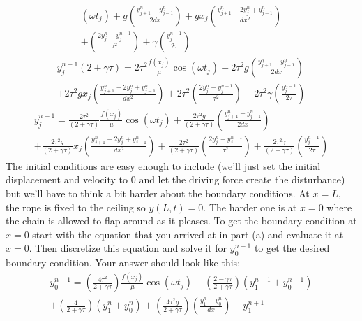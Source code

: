 \begin{enumerate}
\begin{enumerate}
\begin{multline}
  (\omega t_j) + g \left( \frac{y_{j+1}^n - y_{j-1}^n}{2
      dx}\right) + g x_j\left( \frac{y_{j+1}^n - 2 y_j^n +
      y_{j-1}^n}{dx^2}\right)\\ + \left(\frac{ 2 y_j^n -
      y_j^{n-1}}{\tau^2}\right) +
  \gamma \left( \frac{ y_j^{n-1}}{2 \tau}\right) 
\end{multline}
\begin{multline}
  y_j^{n+1}\left( 2 + \gamma \tau\right) = 2\tau^2 \frac{f(x_j)}{\mu} \cos
  (\omega t_j) + 2\tau^2 g \left( \frac{y_{j+1}^n - y_{j-1}^n}{2
      dx}\right)\\ + 2\tau^2 g x_j\left( \frac{y_{j+1}^n - 2 y_j^n +
      y_{j-1}^n}{dx^2}\right) + 2\tau^2\left(\frac{ 2 y_j^n -
      y_j^{n-1}}{\tau^2}\right) +
  2\tau^2\gamma \left( \frac{ y_j^{n-1}}{2 \tau}\right) 
\end{multline}
\begin{multline}
  y_j^{n+1} = \frac{2\tau^2}{\left( 2 + \gamma \tau\right)} \frac{f(x_j)}{\mu}
  \cos (\omega t_j) + \frac{2\tau^2 g }{\left( 2 + \gamma
      \tau\right)} \left( \frac{y_{j+1}^n - y_{j-1}^n}{2 dx}\right)\\ +
  \frac{2\tau^2 g }{\left( 2 + \gamma \tau\right)} x_j\left(
    \frac{y_{j+1}^n - 2 y_j^n + y_{j-1}^n}{dx^2}\right) +
  \frac{2\tau^2}{\left( 2 + \gamma \tau\right)}\left(\frac{ 2
      y_j^n - y_j^{n-1}}{\tau^2}\right) +
  \frac{ 2\tau^2\gamma}{\left( 2 + \gamma \tau\right)} \left(
    \frac{ y_j^{n-1}}{2 \tau}\right) 
\end{multline}
\fi \subprob The initial conditions are easy enough to include (we'll
just set the initial displacement and velocity to 0 and let the
driving force create the disturbance) but we'll have to think a bit
harder about the boundary conditions.  At $x=L$, the rope is fixed to
the ceiling so $y(L,t) = 0$.  The harder one is at $x = 0$ where the
chain is allowed to flap around as it pleases.  To get the boundary
condition at $x = 0$ start with the equation that you arrived at in
part (a) and evaluate it at $x=0$.  Then discretize this equation and
solve it for $ y_0^{n+1}$ to get the desired boundary condition. Your answer should look
like this:
\begin{multline}
  y_0^{n+1}   = \left(\frac{4 \tau^2 }{2 + \gamma \tau}\right)\frac{f(x_j)}{\mu} \cos
  (\omega t_j) - \left(\frac{2 - \gamma \tau }{2 + \gamma
      \tau}\right)\left(  y_1^{n - 1} + y_0^{n - 1}\right) \\ +
  \left(\frac{4 }{2 + \gamma \tau}\right)\left(y_1^n + y_0^n\right) +
  \left(\frac{4 \tau^2g }{2 + \gamma \tau}\right)\left( \frac{y_1^n -
      y_0^n}{ dx}\right) - y_1^{n + 1}
\end{multline}


\end{enumerate}
\end{enumerate}
